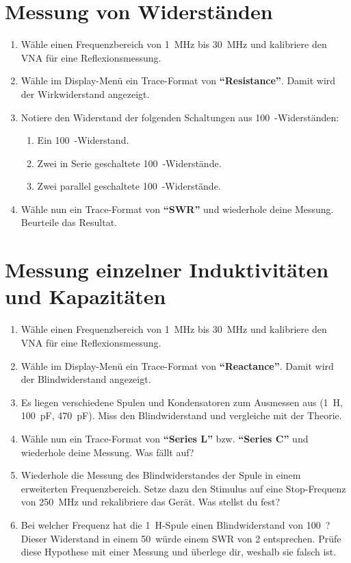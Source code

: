 \documentclass[a4paper,11pt,parskip=half,headings=small,DIV=11,notitlepage,abstract=on]{scrartcl}
\begin{document}
\section{Messung von Widerständen}
\begin{enumerate}
    \item Wähle einen Frequenzbereich von 1~MHz bis 30~MHz und kalibriere den VNA für eine Reflexionsmessung.
    \item Wähle im Display-Menü ein Trace-Format von \textbf{``Resistance''}. Damit wird der Wirkwiderstand angezeigt.
    \item Notiere den Widerstand der folgenden Schaltungen aus 100~\Ohm-Widerständen:
        \begin{enumerate}
            \item Ein 100~\Ohm-Widerstand.
            \item Zwei in Serie geschaltete 100~\Ohm-Widerstände.
            \item Zwei parallel geschaltete 100~\Ohm-Widerstände.
        \end{enumerate}
    \item Wähle nun ein Trace-Format von \textbf{``SWR''} und wiederhole deine Messung. Beurteile das Resultat.
\end{enumerate}

\section{Messung einzelner Induktivitäten und Kapazitäten}
\begin{enumerate}
    \item Wähle einen Frequenzbereich von 1~MHz bis 30~MHz und kalibriere den VNA für eine Reflexionsmessung.
    \item Wähle im Display-Menü ein Trace-Format von \textbf{``Reactance''}. Damit wird der Blindwiderstand angezeigt.
    \item Es liegen verschiedene Spulen und Kondensatoren zum Ausmessen aus (1~\textmu H, 100~pF, 470~pF). Miss den Blindwiderstand und vergleiche mit der Theorie.
    \item Wähle nun ein Trace-Format von \textbf{``Series L''} bzw. \textbf{``Series C''} und wiederhole deine Messung. Was fällt auf?
    \item Wiederhole die Messung des Blindwiderstandes der Spule in einem erweiterten Frequenzbereich. Setze dazu den Stimulus auf eine Stop-Frequenz von 250~MHz und rekalibriere das Gerät. Was stellst du fest?
    \item Bei welcher Frequenz hat die 1~\textmu H-Spule einen Blindwiderstand von 100~\Ohm? Dieser Widerstand in einem 50~\Ohm würde einem
        SWR von 2 entsprechen. Prüfe diese Hypothese mit einer Messung und überlege dir, weshalb sie falsch ist.
\end{enumerate}
\end{document}
